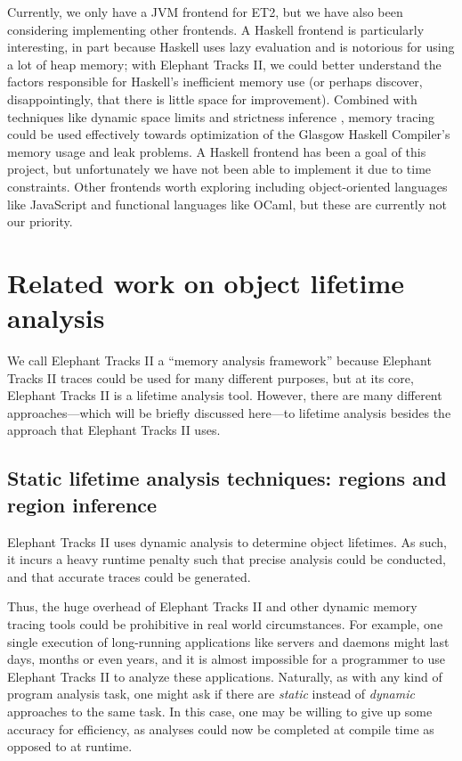Currently, we only have a JVM frontend for ET2, but we have also been considering implementing other frontends. A Haskell frontend is particularly
interesting, in part because Haskell uses lazy evaluation and is notorious for using a lot of heap memory; with Elephant Tracks II, we could better
understand the factors responsible for Haskell's inefficient memory use (or perhaps discover, disappointingly, that there is little space for
improvement). Combined with techniques like dynamic space limits \citep{DynamicSpaceLimits} and strictness inference \citep{Autobahn}, memory tracing could be
used effectively towards optimization of the Glasgow Haskell Compiler's memory usage and leak problems. A Haskell frontend has been a goal of this
project, but unfortunately we have not been able to implement it due to time constraints. Other frontends worth exploring including object-oriented
languages like JavaScript and functional languages like OCaml, but these are currently not our priority.

\section{Related work on object lifetime analysis}
We call Elephant Tracks II a ``memory analysis framework'' because Elephant Tracks II traces could be used
for many different purposes, but at its core, Elephant Tracks II is a lifetime analysis tool. However, there
are many different approaches---which will be briefly discussed here---to lifetime analysis besides the approach that
Elephant Tracks II uses.

\subsection{Static lifetime analysis techniques: regions and region inference}
Elephant Tracks II uses dynamic analysis to determine object lifetimes. As such,
it incurs a heavy runtime penalty such that precise analysis could be conducted, and
that accurate traces could be generated.

Thus, the huge overhead of Elephant Tracks II and other dynamic memory tracing
tools could be prohibitive in real world circumstances. For example, one single
execution of long-running applications like servers and daemons might last days, months
or even years, and it is almost impossible for a programmer to use Elephant Tracks II
to analyze these applications. Naturally, as with any kind of program analysis task, one
might ask if there are \emph{static} instead of \emph{dynamic} approaches to the same task.
In this case, one may be willing to give up some accuracy for efficiency, as analyses could
now be completed at compile time as opposed to at runtime.

